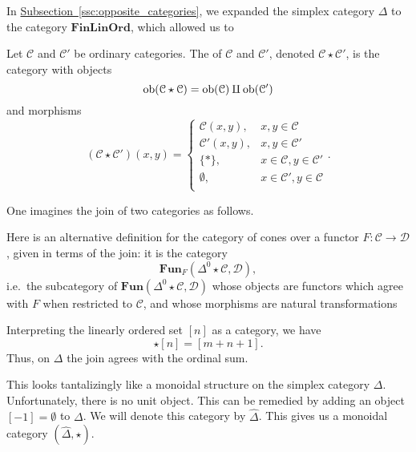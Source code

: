 \documentclass[main.tex]{subfiles}
\begin{document}
In \hyperref[ssc:opposite_categories]{Subsection~\ref*{ssc:opposite_categories}}, we expanded the simplex category $\Delta$ to the category $\mathbf{FinLinOrd}$, which allowed us to

\begin{definition}
  \label{def:join_of_categories}
  Let $\mathcal{C}$ and $\mathcal{C}'$ be ordinary categories. The  of $\mathcal{C}$ and $\mathcal{C}'$, denoted $\mathcal{C} \star \mathcal{C}'$, is the category with objects
  \begin{equation*}
    \operatorname{\mathrm{ob}}(\mathcal{C} \star \mathcal{C}) = \operatorname{\mathrm{ob}}(\mathcal{C}) \amalg \operatorname{\mathrm{ob}}(\mathcal{C}')
  \end{equation*}
  and morphisms
  \begin{equation*}
    (\mathcal{C} \star \mathcal{C}')(x, y) =
    \begin{cases}
      \mathcal{C}(x, y), & x, y \in \mathcal{C} \\
      \mathcal{C}'(x, y), & x, y \in \mathcal{C}' \\
      \{*\}, & x \in \mathcal{C}, y \in \mathcal{C}' \\
      \emptyset, & x \in \mathcal{C}', y \in \mathcal{C} \\
    \end{cases}.
  \end{equation*}
\end{definition}

One imagines the join of two categories as follows.

\begin{example}
  Here is an alternative definition for the category of cones over a functor $F\colon \mathcal{C} \to \mathcal{D}$, given in terms of the join: it is the category
  \begin{equation*}
    \mathbf{Fun}_{F}(\Delta^{0} \star \mathcal{C}, \mathcal{D}),
  \end{equation*}
  i.e.\ the subcategory of $\mathbf{Fun}(\Delta^{0} \star \mathcal{C}, \mathcal{D})$ whose objects are functors which agree with $F$ when restricted to $\mathcal{C}$, and whose morphisms are natural transformations
\end{example}

\begin{example}
  Interpreting the linearly ordered set $[n]$ as a category, we have
  \begin{equation*}
    [m] \star [n] = [m + n + 1].
  \end{equation*}
  Thus, on $\Delta$ the join agrees with the ordinal sum.
\end{example}
This looks tantalizingly like a monoidal structure on the simplex category $\Delta$. Unfortunately, there is no unit object. This can be remedied by adding an object $[-1] = \emptyset$ to $\Delta$. We will denote this category by $\hat{\Delta}$. This gives us a monoidal category $(\hat{\Delta}, \star)$.
\end{document}
